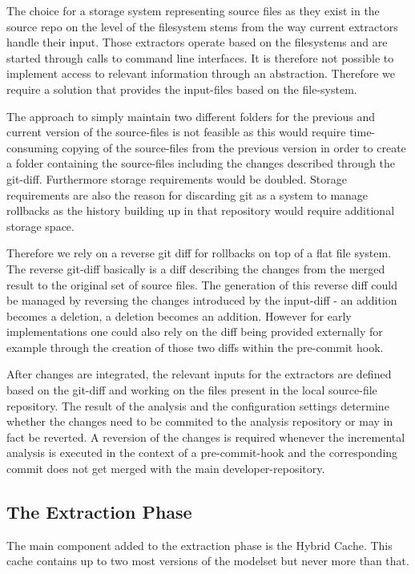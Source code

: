 \documentclass[a4paper]{article}
\begin{document}
The choice for a storage system representing source files as they exist in the source repo on the level of the filesystem stems from the way current extractors handle their input. Those extractors operate based on the filesystems and are started through calls to command line interfaces. It is therefore not possible to implement access to relevant information through an abstraction. Therefore we require a solution that provides the input-files based on the file-system.

The approach to simply maintain two different folders for the previous and current version of the source-files is  not feasible as this would require time-consuming copying of the source-files from the previous version in order to create a folder containing the source-files including the changes described through the git-diff. Furthermore storage requirements would be doubled. Storage requirements are also the reason for discarding git as a system to manage rollbacks as the history building up in that repository would require additional storage space.

Therefore we rely on a reverse git diff for rollbacks on top of a flat file system. The reverse git-diff basically is a diff describing the changes from the merged result to the original set of source files. The generation of this reverse diff could be managed by reversing the changes introduced by the input-diff - an addition becomes a deletion, a deletion becomes an addition. However for early implementations one could also rely on the diff being provided externally for example through the creation of those two diffs within the pre-commit hook.

After changes are integrated, the relevant inputs for the extractors are defined based on the git-diff and working on the files present in the local source-file repository. The result of the analysis and the configuration settings determine whether the changes need to be commited to the analysis repository or may in fact be reverted. A reversion of the changes is required whenever the incremental analysis is executed in the context of a pre-commit-hook and the corresponding commit does not get merged with the main developer-repository.

\subsection{The Extraction Phase}

The main component added to the extraction phase is the Hybrid Cache. This cache contains up to two most versions of the modelset but never more than that.
\end{document}
